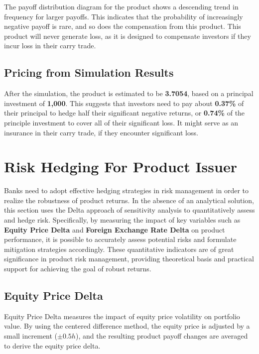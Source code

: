 \documentclass[a4paper, twocolumn]{article}
\begin{document}
The payoff distribution diagram for the product shows a descending trend in frequency for larger payoffs. This indicates that the probability of increasingly negative payoff is rare, and so does the compensation from this product. This product will never generate loss, as it is designed to compensate investors if they incur loss in their carry trade.

\subsection{Pricing from Simulation Results}

After the simulation, the product is estimated to be \textbf{3.7054}, based on a principal investment of \textbf{1,000}. This suggests that investors need to pay about \textbf{0.37\%} of their principal to hedge half their significant negative returns, or \textbf{0.74\%} of the principle investment to cover all of their significant loss. It might serve as an insurance in their carry trade, if they encounter significant loss.

\section{Risk Hedging For Product Issuer}

Banks need to adopt effective hedging strategies in risk management in order to realize the robustness of product returns. In the absence of an analytical solution, this section uses the Delta approach of sensitivity analysis to quantitatively assess and hedge risk. Specifically, by measuring the impact of key variables such as \textbf{Equity Price Delta} and \textbf{Foreign Exchange Rate Delta} on product performance, it is possible to accurately assess potential risks and formulate mitigation strategies accordingly. These quantitative indicators are of great significance in product risk management, providing theoretical basis and practical support for achieving the goal of robust returns.

\subsection{Equity Price Delta}

Equity Price Delta measures the impact of equity price volatility on portfolio value. By using the centered difference method, the equity price is adjusted by a small increment ($\pm 0.5h$), and the resulting product payoff changes are averaged to derive the equity price delta.
\end{document}
